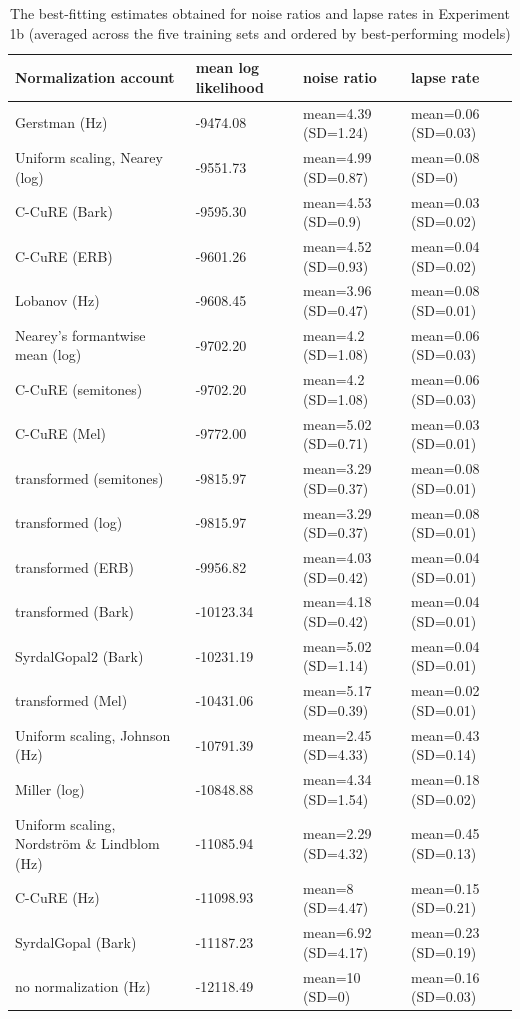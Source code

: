 \documentclass[preprint]{JASA}
\begin{document}
\begin{table}
\small
\caption{\label{tab:SI-best-fits-1b}The best-fitting estimates obtained for noise ratios and lapse rates in Experiment 1b (averaged across the five training sets and ordered by best-performing models)}
\small
\centering
\begin{tabular}{p{7cm}p{2cm}p{4cm}p{4cm}}
\toprule
Normalization account & mean log likelihood & noise ratio & lapse rate\\
\midrule
Gerstman (Hz) & -9474.08 & mean=4.39 (SD=1.24) & mean=0.06 (SD=0.03)\\
Uniform scaling, Nearey (log) & -9551.73 & mean=4.99 (SD=0.87) & mean=0.08 (SD=0)\\
C-CuRE (Bark) & -9595.30 & mean=4.53 (SD=0.9) & mean=0.03 (SD=0.02)\\
C-CuRE (ERB) & -9601.26 & mean=4.52 (SD=0.93) & mean=0.04 (SD=0.02)\\
Lobanov (Hz) & -9608.45 & mean=3.96 (SD=0.47) & mean=0.08 (SD=0.01)\\
Nearey's formantwise mean (log) & -9702.20 & mean=4.2 (SD=1.08) & mean=0.06 (SD=0.03)\\
C-CuRE (semitones) & -9702.20 & mean=4.2 (SD=1.08) & mean=0.06 (SD=0.03)\\
C-CuRE (Mel) & -9772.00 & mean=5.02 (SD=0.71) & mean=0.03 (SD=0.01)\\
transformed (semitones) & -9815.97 & mean=3.29 (SD=0.37) & mean=0.08 (SD=0.01)\\
transformed (log) & -9815.97 & mean=3.29 (SD=0.37) & mean=0.08 (SD=0.01)\\
transformed (ERB) & -9956.82 & mean=4.03 (SD=0.42) & mean=0.04 (SD=0.01)\\
transformed (Bark) & -10123.34 & mean=4.18 (SD=0.42) & mean=0.04 (SD=0.01)\\
SyrdalGopal2 (Bark) & -10231.19 & mean=5.02 (SD=1.14) & mean=0.04 (SD=0.01)\\
transformed (Mel) & -10431.06 & mean=5.17 (SD=0.39) & mean=0.02 (SD=0.01)\\
Uniform scaling, Johnson (Hz) & -10791.39 & mean=2.45 (SD=4.33) & mean=0.43 (SD=0.14)\\
Miller (log) & -10848.88 & mean=4.34 (SD=1.54) & mean=0.18 (SD=0.02)\\
Uniform scaling, Nordström \& Lindblom (Hz) & -11085.94 & mean=2.29 (SD=4.32) & mean=0.45 (SD=0.13)\\
C-CuRE (Hz) & -11098.93 & mean=8 (SD=4.47) & mean=0.15 (SD=0.21)\\
SyrdalGopal (Bark) & -11187.23 & mean=6.92 (SD=4.17) & mean=0.23 (SD=0.19)\\
no normalization (Hz) & -12118.49 & mean=10 (SD=0) & mean=0.16 (SD=0.03)\\
\bottomrule
\end{tabular}
\end{table}
\end{document}
